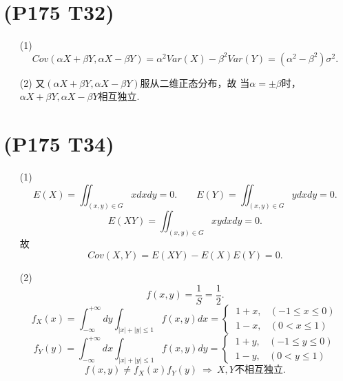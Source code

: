 \documentclass{article}
\begin{document}
\section{(P175 T32)}  %
\begin{enumerate}
    \item [(1)]
    \[
        Cov (\alpha X + \beta Y, \alpha X - \beta Y)
        = \alpha ^2 Var (X) - \beta ^2 Var(Y)
        = (\alpha ^2 - \beta ^2) \sigma^2 .
    \]
    \item [(2)]
    又$(\alpha X + \beta Y, \alpha X - \beta Y)$服从二维正态分布，故
    当$\alpha = \pm \beta $时，$\alpha X + \beta Y, \alpha X - \beta Y$相互独立.
\end{enumerate}

\section{(P175 T34)}  %
\begin{enumerate}
    \item [(1)]
    \[
        E(X)
        = \iint_{(x,y) \in G} x dx dy
        = 0.   
        \qquad
        E(Y)
        = \iint_{(x,y) \in G} y dx dy
        = 0.   
    \]
    \[
        E(XY)
        = \iint_{(x,y) \in G} xy dx dy
        = 0.   
    \]
    故
    \[
        Cov(X,Y)
        = E(XY) - E(X) E(Y)
        = 0.    
    \]
    \item [(2)]
    \[
        f(x,y) = \frac{1}{S} = \frac{1}{2}.    
    \]
    \[
        f_X (x) 
        = \int_{-\infty}^{+\infty} dy \int_{|x|+|y|\leq 1} f(x,y) dx
        = 
        \begin{cases}
            \ 1+x, & (-1\leq x\leq 0)\\
            \ 1-x, & (0< x \leq 1)    
        \end{cases}
    \]
    \[
        f_Y (y) 
        = \int_{-\infty}^{+\infty} dx \int_{|x|+|y|\leq 1} f(x,y) dy
        = 
        \begin{cases}
            \ 1+y, & (-1\leq y \leq 0)\\
            \ 1-y, & (0< y \leq 1)    
        \end{cases}
    \]
    \[
        f(x,y) \neq f_X (x) f_Y(y)
        \ \Rightarrow\ 
        X,Y \mbox{不相互独立}.    
    \]
\end{enumerate}
\end{document}
